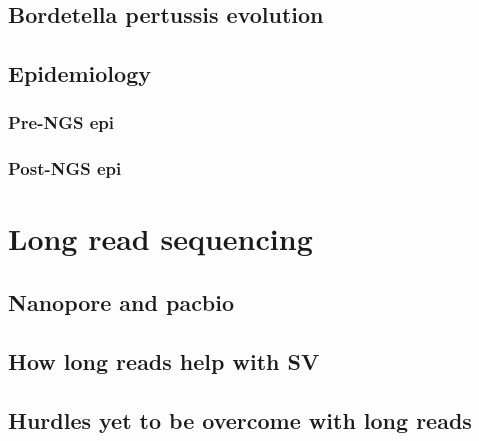 \documentclass{article}
\begin{document}
\subsection{Bordetella pertussis evolution}

\subsection{Epidemiology}

\subsubsection{Pre-NGS epi}

\subsubsection{Post-NGS epi}


\subsection{}


\section{Long read sequencing}
\subsection{Nanopore and pacbio}
\subsection{How long reads help with SV}
\subsection{Hurdles yet to be overcome with long reads}
\end{document}
